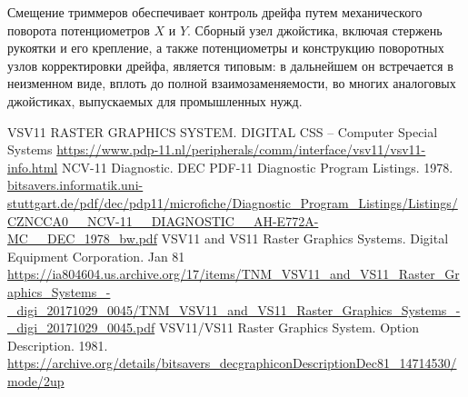 \documentclass[11pt, a4paper]{article}
\begin{document}
Смещение триммеров обеспечивает контроль дрейфа путем механического поворота потенциометров $X$ и $Y$. Сборный узел джойстика, включая стержень рукоятки и его крепление, а также потенциометры и конструкцию поворотных узлов корректировки дрейфа, является типовым: в дальнейшем он встречается в неизменном виде, вплоть до полной взаимозаменяемости, во многих аналоговых джойстиках, выпускаемых для промышленных нужд.

\begin{thebibliography}{9}
 VSV11 RASTER GRAPHICS SYSTEM. D\textbar I\textbar G\textbar I\textbar T\textbar A\textbar L CSS -- Computer Special Systems \url{https://www.pdp-11.nl/peripherals/comm/interface/vsv11/vsv11-info.html}
 NCV-11 Diagnostic. DEC PDF-11 Diagnostic Program Listings. 1978. \url{bitsavers.informatik.uni-stuttgart.de/pdf/dec/pdp11/microfiche/Diagnostic_Program_Listings/Listings/CZNCCA0__NCV-11__DIAGNOSTIC__AH-E772A-MC__DEC_1978_bw.pdf}
 VSV11 and VS11 Raster Graphics Systems. Digital Equipment Corporation. Jan 81 \url{https://ia804604.us.archive.org/17/items/TNM_VSV11_and_VS11_Raster_Graphics_Systems_-_digi_20171029_0045/TNM_VSV11_and_VS11_Raster_Graphics_Systems_-_digi_20171029_0045.pdf}
 VSV11/VS11 Raster Graphics System. Option Description. 1981. \url{https://archive.org/details/bitsavers_decgraphiconDescriptionDec81_14714530/mode/2up}
\end{thebibliography}
\end{document}
